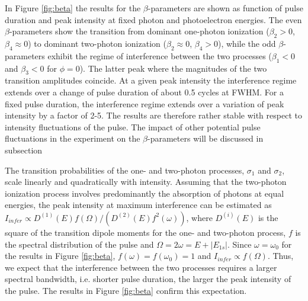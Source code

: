 In Figure \ref{fig:beta} the results for the \textbf{$\beta$}-parameters are shown as function of pulse duration and peak intensity at fixed photon and photoelectron energies. The even $\beta$-parameters show the transition from dominant one-photon ionization ($\beta_2 > 0$, $\beta_4 \approx 0$) to dominant two-photon ionization ($\beta_2 \approx 0$, $\beta_4 > 0$), while the odd $\beta$-parameters exhibit the regime of interference between the two processes ($\beta_1 < 0$ and $\beta_3 < 0$ for $\phi=0$). The latter peak where the magnitudes of the two transition amplitudes coincide. At a given peak intensity the interference regime extends over a change of pulse duration of about 0.5 cycles at FWHM. For a fixed pulse duration, the interference regime extends over a variation of peak intensity by a factor of 2-5. The results are therefore rather stable with respect to intensity fluctuations of the pulse. The impact of other potential pulse fluctuations in the experiment on the $\beta$-parameters will be discussed in subsection

The transition probabilities of the one- and two-photon processes, $\sigma_1$ and $\sigma_2$, scale linearly and quadratically with intensity. Assuming that the two-photon ionization process involves predominantly the absorption of photons at equal energies, the peak intensity at maximum interference can be estimated as $I_{infer} \propto D^{(1)}(E)f(\Omega)/(D^{(2)}(E)f^2(\omega))$, where $D^{(i)}(E)$ is the square of the transition dipole moments for the one- and two-photon process, $f$ is the spectral distribution of the pulse and $\Omega = 2\omega = E + |E_{1s}|$. Since $\omega = \omega_0$ for the results in Figure \ref{fig:beta}, $f(\omega) = f(\omega_0) = 1$ and $I_{infer} \propto f(\Omega)$. Thus, we expect that the interference between the two processes requires a larger spectral bandwidth, i.e. shorter pulse duration, the larger the peak intensity of the pulse. The results in Figure \ref{fig:beta} confirm this expectation.

